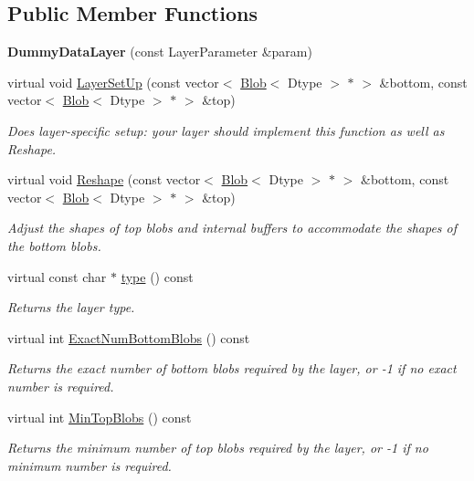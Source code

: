 \subsection*{Public Member Functions}
\begin{DoxyCompactItemize}
\item 
{\bfseries Dummy\+Data\+Layer} (const Layer\+Parameter \&param)\hypertarget{classcaffe_1_1DummyDataLayer_a98568bcfa177c5eef82ebd0f50465c78}{}\label{classcaffe_1_1DummyDataLayer_a98568bcfa177c5eef82ebd0f50465c78}

\item 
virtual void \hyperlink{classcaffe_1_1DummyDataLayer_a7469fb111146a3f2a3121a3f1adb2c31}{Layer\+Set\+Up} (const vector$<$ \hyperlink{classcaffe_1_1Blob}{Blob}$<$ Dtype $>$ $\ast$ $>$ \&bottom, const vector$<$ \hyperlink{classcaffe_1_1Blob}{Blob}$<$ Dtype $>$ $\ast$ $>$ \&top)
\begin{DoxyCompactList}\small\item\em Does layer-\/specific setup\+: your layer should implement this function as well as Reshape. \end{DoxyCompactList}\item 
virtual void \hyperlink{classcaffe_1_1DummyDataLayer_ab05d22a6458132c47488cdf2f53a0104}{Reshape} (const vector$<$ \hyperlink{classcaffe_1_1Blob}{Blob}$<$ Dtype $>$ $\ast$ $>$ \&bottom, const vector$<$ \hyperlink{classcaffe_1_1Blob}{Blob}$<$ Dtype $>$ $\ast$ $>$ \&top)
\begin{DoxyCompactList}\small\item\em Adjust the shapes of top blobs and internal buffers to accommodate the shapes of the bottom blobs. \end{DoxyCompactList}\item 
virtual const char $\ast$ \hyperlink{classcaffe_1_1DummyDataLayer_ad3274d1aacd5ce73f6fcf15de15a1784}{type} () const \hypertarget{classcaffe_1_1DummyDataLayer_ad3274d1aacd5ce73f6fcf15de15a1784}{}\label{classcaffe_1_1DummyDataLayer_ad3274d1aacd5ce73f6fcf15de15a1784}

\begin{DoxyCompactList}\small\item\em Returns the layer type. \end{DoxyCompactList}\item 
virtual int \hyperlink{classcaffe_1_1DummyDataLayer_ad25325d52be96802665c21acc792c6dc}{Exact\+Num\+Bottom\+Blobs} () const 
\begin{DoxyCompactList}\small\item\em Returns the exact number of bottom blobs required by the layer, or -\/1 if no exact number is required. \end{DoxyCompactList}\item 
virtual int \hyperlink{classcaffe_1_1DummyDataLayer_a82dba92b339f5d1e0d987fae8d47cd02}{Min\+Top\+Blobs} () const 
\begin{DoxyCompactList}\small\item\em Returns the minimum number of top blobs required by the layer, or -\/1 if no minimum number is required. \end{DoxyCompactList}\end{DoxyCompactItemize}
